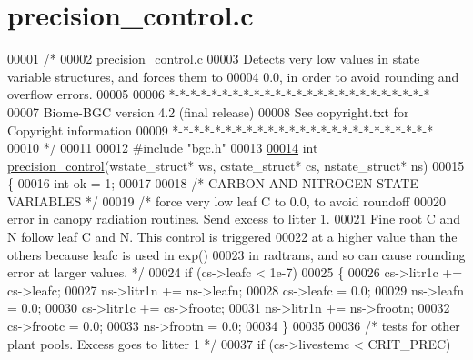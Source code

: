 \hypertarget{precision__control_8c_source}{}\section{precision\+\_\+control.\+c}
\label{precision__control_8c_source}

\begin{DoxyCode}
00001 \textcolor{comment}{/* }
00002 \textcolor{comment}{precision\_control.c}
00003 \textcolor{comment}{Detects very low values in state variable structures, and forces them to}
00004 \textcolor{comment}{0.0, in order to avoid rounding and overflow errors.}
00005 \textcolor{comment}{}
00006 \textcolor{comment}{*-*-*-*-*-*-*-*-*-*-*-*-*-*-*-*-*-*-*-*-*-*-*-*-*}
00007 \textcolor{comment}{Biome-BGC version 4.2 (final release)}
00008 \textcolor{comment}{See copyright.txt for Copyright information}
00009 \textcolor{comment}{*-*-*-*-*-*-*-*-*-*-*-*-*-*-*-*-*-*-*-*-*-*-*-*-*}
00010 \textcolor{comment}{*/}
00011 
00012 \textcolor{preprocessor}{#include "bgc.h"}
00013 
\hypertarget{precision__control_8c_source_l00014}{}\hyperlink{precision__control_8c_a20e713bc8669fc41d516c218ef848e01}{00014} \textcolor{keywordtype}{int} \hyperlink{precision__control_8c_a20e713bc8669fc41d516c218ef848e01}{precision\_control}(wstate\_struct* ws, cstate\_struct* cs, nstate\_struct* ns)
00015 \{
00016     \textcolor{keywordtype}{int} ok = 1;
00017     
00018     \textcolor{comment}{/* CARBON AND NITROGEN STATE VARIABLES */}
00019     \textcolor{comment}{/* force very low leaf C to 0.0, to avoid roundoff}
00020 \textcolor{comment}{    error in canopy radiation routines. Send excess to litter 1.}
00021 \textcolor{comment}{    Fine root C and N follow leaf C and N. This control is triggered}
00022 \textcolor{comment}{    at a higher value than the others because leafc is used in exp()}
00023 \textcolor{comment}{    in radtrans, and so can cause rounding error at larger values. */}
00024     \textcolor{keywordflow}{if} (cs->leafc < 1e-7)
00025     \{
00026         cs->litr1c += cs->leafc;
00027         ns->litr1n += ns->leafn;
00028         cs->leafc = 0.0;
00029         ns->leafn = 0.0;
00030         cs->litr1c += cs->frootc;
00031         ns->litr1n += ns->frootn;
00032         cs->frootc = 0.0;
00033         ns->frootn = 0.0;
00034     \}
00035 
00036     \textcolor{comment}{/* tests for other plant pools. Excess goes to litter 1 */}
00037     \textcolor{keywordflow}{if} (cs->livestemc < CRIT\_PREC)

\end{DoxyCode}
